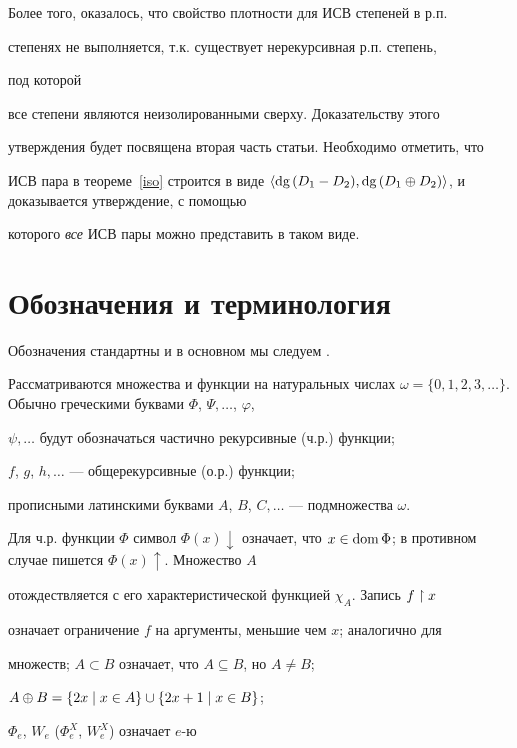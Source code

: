 Более того, оказалось, что свойство плотности для ИСВ \pp степеней в р.п. 


степенях не выполняется, т.к. существует нерекурсивная р.п. степень,


под которой


все \pp степени являются неизолированными сверху. Доказательству этого 


утверждения будет посвящена вторая часть статьи. Необходимо отметить, что


ИСВ пара в теореме~\ref{iso} строится в виде $\langle\text{dg\,}\draz,


\text{dg\,}\dsum\rangle$, и доказывается утверждение, с помощью 


которого {\it все} ИСВ пары можно представить в таком виде.





\section{Обозначения и терминология}





Обозначения стандартны и в основном мы следуем \cite{So}.


Рассматриваются множества и функции на натуральных числах $\omega=\{0,1,


2,3,\dotsc\}$. Обычно греческими буквами $\Phi$, $\Psi,\dotsc$, $\varphi$,


$\psi,\dotsc$ будут обозначаться частично рекурсивные (ч.р.) функции;


$f$, $g$, $h,\dotsc$ --- общерекурсивные (о.р.) функции; 


прописными латинскими буквами $A$, $B$, $C,\dotsc$ --- подмножества $\omega$.


Для ч.р. функции $\Phi$ символ $\Phi(x)\downarrow$ означает, что $x\in\dom


\Phi$; в противном случае пишется $\Phi(x)\uparrow$. Множество $A$


отождествляется с его характеристической функцией $\chi_A$. Запись $f\restriction x$


означает ограничение $f$ на аргументы, меньшие чем $x$; аналогично для 


множеств; $A\subset B$ означает, что $A\subseteq B$, но $A\ne B$;


$A\oplus B=\{2x\mid x\in A\}\cup\{2x+1\mid x\in B\}$;


$\Phi_e$, $W_e$ ($\Phi_e^X$, $W_e^X$) означает $e$-ю


